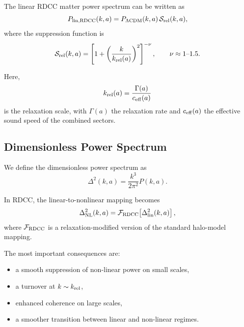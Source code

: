 \documentclass[11pt,a4paper]{article}
\begin{document}
The linear RDCC matter power spectrum can be written as
\begin{equation}
P_{\rm lin,RDCC}(k,a)
= P_{\Lambda{\rm CDM}}(k,a)\,
\mathcal{S}_{\rm rel}(k,a),
\end{equation}
where the suppression function is
\begin{equation}
\mathcal{S}_{\rm rel}(k,a)
= \left[1 + \left(\frac{k}{k_{\rm rel}(a)}\right)^2\right]^{-\nu},
\qquad \nu \approx 1\text{--}1.5.
\end{equation}

Here,
\begin{equation}
k_{\rm rel}(a)
= \frac{\Gamma(a)}{c_{\rm eff}(a)}
\end{equation}
is the relaxation scale, with $\Gamma(a)$ the relaxation rate and $c_{\rm eff}(a)$ the effective
sound speed of the combined sectors.

\subsection{Dimensionless Power Spectrum}

We define the dimensionless power spectrum as
\begin{equation}
\Delta^2(k,a)
= \frac{k^3}{2\pi^2} P(k,a).
\end{equation}

In RDCC, the linear-to-nonlinear mapping becomes
\begin{equation}
\Delta^2_{\rm NL}(k,a)
= \mathcal{F}_{\rm RDCC}\!\left[\Delta^2_{\rm lin}(k,a)\right],
\end{equation}
where $\mathcal{F}_{\rm RDCC}$ is a relaxation-modified version of the standard halo-model
mapping.

The most important consequences are:
\begin{itemize}
\item a smooth suppression of non-linear power on small scales,
\item a turnover at $k \sim k_{\rm rel}$,
\item enhanced coherence on large scales,
\item a smoother transition between linear and non-linear regimes.
\end{itemize}

\end{document}
